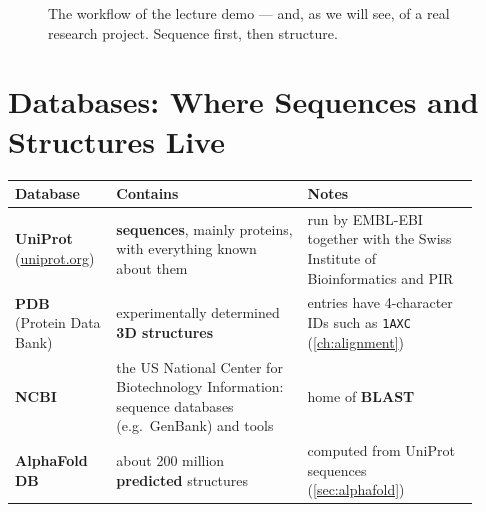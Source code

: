 \documentclass[11pt, oneside]{book}
\let\originalsection\section
\renewcommand{\section}{\Needspace{7\baselineskip}\originalsection}
\begin{document}
\begin{figure}[htbp]
\centering
{}
\caption{The workflow of the lecture demo --- and, as we will see, of a real
research project. Sequence first, then structure.}
\label{fig:tool-workflow}
\end{figure}

\section{Databases: Where Sequences and Structures Live}
\label{sec:databases}

\begin{center}
\small
\begin{tabular}{@{}p{0.2\linewidth}p{0.38\linewidth}p{0.34\linewidth}@{}}
\toprule
\textbf{Database} & \textbf{Contains} & \textbf{Notes} \\
\midrule
\textbf{UniProt} (\url{uniprot.org}) &
\textbf{sequences}, mainly proteins, with everything known about them &
run by EMBL-EBI together with the Swiss Institute of Bioinformatics and PIR \\
\textbf{PDB} (Protein Data Bank) &
experimentally determined \textbf{3D structures} &
entries have 4-character IDs such as \texttt{1AXC} (\cref{ch:alignment}) \\
\textbf{NCBI} &
the US National Center for Biotechnology Information: sequence databases
(e.g.\ GenBank) and tools &
home of \textbf{BLAST} \\
\textbf{AlphaFold DB} &
about 200 million \textbf{predicted} structures &
computed from UniProt sequences (\cref{sec:alphafold}) \\
\bottomrule
\end{tabular}
\end{center}
\end{document}
